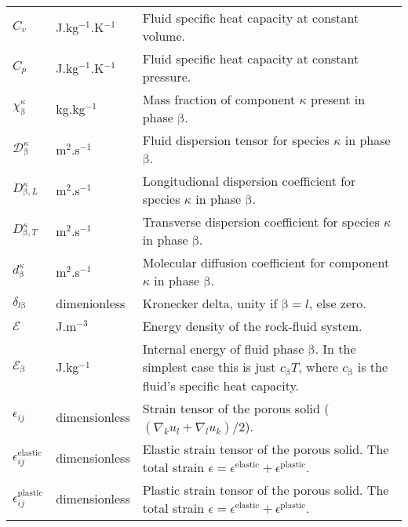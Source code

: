 \documentclass[12pt]{report}
\def\species{\kappa}
\def\phase{\mathrm{\beta}}
\def\massfrac{\chi}
\def\energydens{\mathcal{E}}
\begin{document}
\begin{longtable}{llp{10cm}}
$C_{v}$ & J.kg$^{-1}$.K$^{-1}$ & Fluid specific heat capacity at
constant volume. \\

$C_{p}$ & J.kg$^{-1}$.K$^{-1}$ & Fluid specific heat capacity at
constant pressure. \\

$\massfrac_{\phase}^{\species}$ & kg.kg$^{-1}$ & Mass fraction of
component $\species$ present in phase $\phase$. \\

${\mathcal{D}}_{\phase}^{\species}$ & m$^{2}$.s$^{-1}$ & Fluid
dispersion tensor for species $\species$ in phase $\phase$. \\

$D_{\phase,L}^{\species}$ & m$^{2}$.s$^{-1}$ & Longitudional
dispersion coefficient for species $\species$ in phase $\phase$. \\

$D_{\phase,T}^{\species}$ & m$^{2}$.s$^{-1}$ & Transverse
dispersion coefficient for species $\species$ in phase $\phase$. \\

$d_{\phase}^{\species}$ & m$^{2}$.s$^{-1}$ & Molecular diffusion
coefficient for component $\species$ in phase $\phase$. \\

$\delta_{l \phase}$ & dimenionless & Kronecker delta, unity if $\phase
=l$, else zero. \\

$\energydens$ & J.m$^{-3}$ & Energy density of the rock-fluid
system. \\

$\energydens_{\phase}$ & J.kg$^{-1}$ & Internal energy of fluid phase
$\phase$. In the simplest case this is just $c_{\phase}T$, where
$c_{\phase}$ is the fluid's specific heat capacity.\\

$\epsilon_{ij}$ & dimensionless & Strain tensor of the porous solid
($(\nabla_{k}u_{l} + \nabla_{l}u_{k})/2$). \\

$\epsilon^{\mathrm{elastic}}_{ij}$ & dimensionless & Elastic strain
tensor of the porous solid.  The total strain $\epsilon =
\epsilon^{\mathrm{elastic}} + \epsilon^{\mathrm{plastic}}$. \\

$\epsilon^{\mathrm{plastic}}_{ij}$ & dimensionless & Plastic strain
tensor of the porous solid.  The total strain $\epsilon =
\epsilon^{\mathrm{elastic}} + \epsilon^{\mathrm{plastic}}$. \\


\end{longtable}
\end{document}
